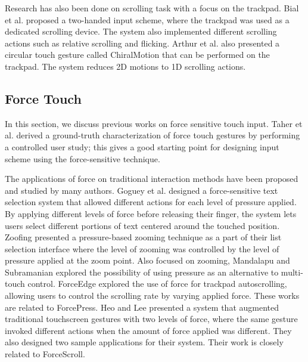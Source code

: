 \documentclass{sigchi}
\begin{document}
Research has also been done on scrolling task with a focus on the trackpad. Bial et al. \cite{bial2010study} proposed a two-handed input scheme, where the trackpad was used as a dedicated scrolling device. The system also implemented different scrolling actions such as relative scrolling and flicking. Arthur et al. \cite{arthur2008evaluating} also presented a circular touch gesture called ChiralMotion that can be performed on the trackpad. The system reduces 2D motions to 1D scrolling actions.


\subsection{Force Touch}
In this section, we discuss previous works on force sensitive touch input. Taher et al. \cite{taher2014empirical} derived a ground-truth characterization of force touch gestures by performing a controlled user study; this gives a good starting point for designing input scheme using the force-sensitive technique. 


The applications of force on traditional interaction methods have been proposed and studied by many authors. Goguey et al. \cite{goguey2018improving} designed a force-sensitive text selection system that allowed different actions for each level of pressure applied. By applying different levels of force before releasing their finger, the system lets users select different portions of text centered around the touched position. Zoofing \cite{quinn2009zoofing} presented a pressure-based zooming technique as a part of their list selection interface where the level of zooming was controlled by the level of pressure applied at the zoom point. Also focused on zooming, Mandalapu and Subramanian \cite{mandalapu2011exploring} explored the possibility of using pressure as an alternative to multi-touch control. ForceEdge \cite{antoine2017forceedge} explored the use of force for trackpad autoscrolling, allowing users to control the scrolling rate by varying applied force. These works are related to ForcePress. Heo and Lee \cite{heo2011force} presented a system that augmented traditional touchscreen gestures with two levels of force, where the same gesture invoked different actions when the amount of force applied was different. They also designed two sample applications for their system. Their work is closely related to ForceScroll. 
\end{document}
